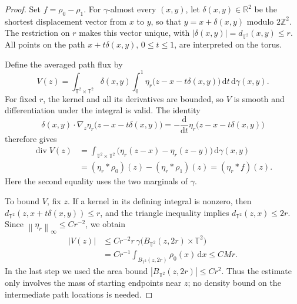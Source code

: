 \documentclass[11pt]{article}
\newcommand{\R}{\mathbb R}
\newcommand{\Z}{\mathbb Z}
\newcommand{\T}{\mathbb T^2}
\newcommand{\diver}{\operatorname{div}}
\newcommand{\norm}[1]{\left\lVert #1\right\rVert}
\newcommand{\abs}[1]{\left\lvert #1\right\rvert}
\theoremstyle{remark}
\numberwithin{equation}{section}
\begin{document}
\begin{proof}
Set \(f=\rho_0-\rho_1\). For \(\gamma\)-almost every \((x,y)\),
let \(\delta(x,y)\in\R^2\) be the shortest displacement vector from
\(x\) to \(y\), so that \(y=x+\delta(x,y)\) modulo \(2\Z^2\).
The restriction on \(r\) makes this vector unique, with
\(\abs{\delta(x,y)}=d_{\T}(x,y)\le r\). All points on the path
\(x+t\delta(x,y)\), \(0\le t\le1\), are interpreted on the torus.

Define the averaged path flux by
\[
 V(z)=\int_{\T\times\T}
 \delta(x,y)\int_0^1
 \eta_r\bigl(z-x-t\delta(x,y)\bigr)\,\mathrm dt
 \,\mathrm d\gamma(x,y).
\]
For fixed \(r\), the kernel and all its derivatives are bounded, so
\(V\) is smooth and differentiation under the integral is valid.
The identity
\[
 \delta(x,y)\cdot\nabla_z
 \eta_r\bigl(z-x-t\delta(x,y)\bigr)
 =-\frac{\mathrm d}{\mathrm dt}
 \eta_r\bigl(z-x-t\delta(x,y)\bigr)
\]
therefore gives
\begin{align*}
 \diver V(z)
 &=\int_{\T\times\T}
   \bigl(\eta_r(z-x)-\eta_r(z-y)\bigr)
   \,\mathrm d\gamma(x,y)\\
 &=(\eta_r*\rho_0)(z)-(\eta_r*\rho_1)(z)
  =(\eta_r*f)(z).
\end{align*}
Here the second equality uses the two marginals of \(\gamma\).

To bound \(V\), fix \(z\). If a kernel in its defining integral is
nonzero, then
\(d_{\T}(z,x+t\delta(x,y))\le r\), and the triangle inequality
implies \(d_{\T}(z,x)\le2r\). Since
\(\norm{\eta_r}_\infty\le Cr^{-2}\), we obtain
\begin{align*}
 |V(z)|
 &\le Cr^{-2}r\,
   \gamma\bigl(B_{\T}(z,2r)\times\T\bigr)\\
 &=Cr^{-1}\int_{B_{\T}(z,2r)}\rho_0(x)\,\mathrm dx
 \le CMr.
\end{align*}
In the last step we used the area bound
\(\abs{B_{\T}(z,2r)}\le Cr^2\). Thus the estimate only involves
the mass of starting endpoints near \(z\); no density bound on the
intermediate path locations is needed.


\end{proof}
\end{document}
